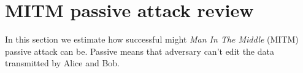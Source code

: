 \section{MITM passive attack review}
In this section we estimate how successful might \textit{Man In The Middle} (MITM) passive attack can be. Passive means that adversary can't edit the data transmitted by Alice and Bob. 